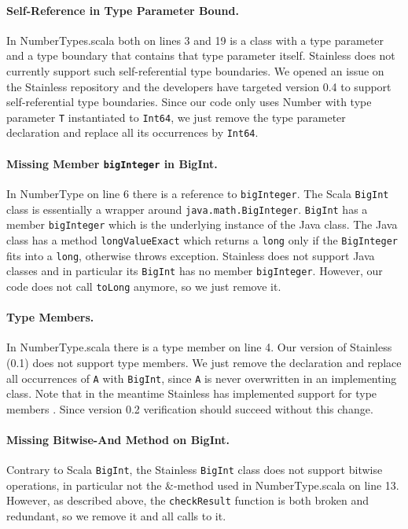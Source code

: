 \documentclass[hyphens, a4paper,USenglish,cleveref, autoref, thm-restate]{oasics-v2019}
\begin{document}
\paragraph{Self-Reference in Type Parameter Bound.} In
NumberTypes.scala both on lines 3 and 19 is a class with a type
parameter and a type boundary that contains that type parameter
itself. Stainless does not currently support such self-referential
type boundaries. We opened an issue \cite{Stainless:issue519} on the
Stainless repository and the developers have targeted version 0.4 to
support self-referential type boundaries. Since our code only uses
Number with type parameter \texttt{T} instantiated to \texttt{Int64}, we just remove the
type parameter declaration and replace all its occurrences by \texttt{Int64}.

\paragraph{Missing Member \texttt{bigInteger} in BigInt.} In
NumberType on line 6 there is a reference to \texttt{bigInteger}. The
Scala \texttt{BigInt} class is essentially a wrapper around
\texttt{java.math.BigInteger}. \texttt{BigInt} has a member
\texttt{bigInteger} which is the underlying instance of the Java
class. The Java class has a method \texttt{longValueExact} which
returns a \texttt{long} only if the \texttt{BigInteger} fits into a
\texttt{long}, otherwise throws exception. Stainless does not support
Java classes and in particular its \texttt{BigInt} has no member
\texttt{bigInteger}. However, our code does not call \texttt{toLong}
anymore, so we just remove it.

\paragraph{Type Members.} In NumberType.scala there is a type member
on line 4. Our version of Stainless (0.1) does not support type
members. We just remove the declaration and replace all occurrences of
\texttt{A} with \texttt{BigInt}, since \texttt{A} is never overwritten in an implementing class.
Note that in the meantime Stainless has implemented support for type
members \cite{Stainless:pull470}. Since version 0.2 verification
should succeed without this change.


\paragraph{Missing Bitwise-And Method on BigInt.} Contrary to Scala
\texttt{BigInt}, the Stainless \texttt{BigInt} class does not support bitwise
operations, in particular not the \&-method used in NumberType.scala
on line 13. However, as described above, the \texttt{checkResult} function is
both broken and redundant, so we remove it and all calls to it.
\end{document}

